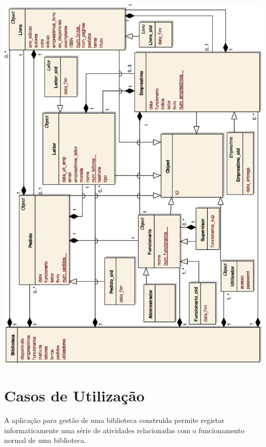 \documentclass[12pt,a4paper,reqno]{report}
\numberwithin{figure}{section}
\numberwithin{equation}{section}
\begin{document}
\begin{center}

\includegraphics[width=14.4cm]{UML.jpg}

\end{center}

\chapter{Casos de Utilização}

A aplicação para gestão de uma biblioteca construída permite registar informaticamente uma série de atividades relacionadas com o funcionamento normal de uma biblioteca.
\end{document}
